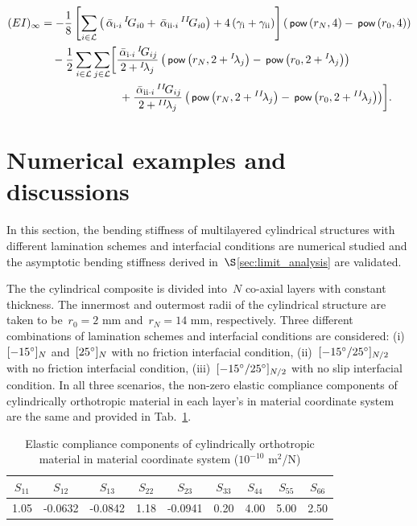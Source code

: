 \documentclass[preprint,12pt,times]{elsarticle}
\numberwithin{equation}{section}
\newcommand{\pr}[1]{\left( #1 \right)}
\newcommand{\p}{\,\textsf{\small pow}}
\newcommand{\alphaBARsub}[2]{
\IfEqCase{#2}{
        {i}{\,\bar{\alpha}_{ {#1}\cdot { \scriptstyle #2}}\,}%
    }[\,\bar{\alpha}_{ {#1}\cdot {\scriptscriptstyle #2}}\,]}
\newcommand{\RN}[1]{%
  \textup{\uppercase\expandafter{\romannumeral#1}}%
}
\renewcommand{\>}{$\Rightarrow$}
\begin{document}
\begin{equation}
\begin{aligned}
(EI)_{\infty}  & = - \frac{1}{8} \left[ \sum_{i \in \mathcal{L}} \left( \alphaBARsub{\RN{1}}{i} {}^{I}\!G_{i0} + \alphaBARsub{\RN{2}}{i} {}^{II}\!G_{i0} \right) + 4\left( \gamma_{\RN{1}} +\gamma_{\RN{2}} \right) \right] \left( \p\pr{r_{N},4} - \p\pr{r_{0},4} \right) \\
  & \quad - \frac{1}{2} \sum_{i \in \mathcal{L}} \sum_{j \in \mathcal{L}} \biggr[ \frac{\alphaBARsub{\RN{1}}{i} {}^{I}\!G_{ij}}{2 + {}^{I}\!\lambda_{j} } \left( \p\pr{r_{N},2 + {}^{I}\!\lambda_{j}} - \p\pr{r_{0},2 + {}^{I}\!\lambda_{j}} \right) \\
  & \qquad \qquad \qquad \quad + \frac{\alphaBARsub{\RN{2}}{i} {}^{II}\!G_{ij}}{2 + {}^{II}\!\lambda_{j}} \left( \p\pr{r_{N},2 + {}^{II}\!\lambda_{j}} - \p\pr{r_{0},2 + {}^{II}\!\lambda_{j}} \right) \biggr] .
\end{aligned}
\label{eq:two_mat_no_slip_EI}
\end{equation}
\section{Numerical examples and discussions}
\label{sec:discussion}
In this section, the bending stiffness of multilayered cylindrical structures with different lamination schemes and interfacial conditions are numerical studied and the asymptotic bending stiffness derived in~$\S$\ref{sec:limit_analysis} are validated.

The the cylindrical composite is divided into~$N$ co-axial layers with constant thickness.
The innermost and outermost radii of the cylindrical structure are taken to be~$r_{0} = 2$ mm and~$r_{N} = 14$ mm, respectively.
Three different combinations of lamination schemes and interfacial conditions are considered: (i)~$[-15 \degree]_N$ and~$[25 \degree]_N$ with no friction interfacial condition, (ii)~$[-15 \degree/ 25 \degree]_{N/2}$ with no friction interfacial condition, (iii)~$[-15 \degree/25 \degree]_{N/2}$ with no slip interfacial condition. In all three scenarios, the non-zero elastic compliance components of cylindrically orthotropic material in each layer's in material coordinate system are the same and provided in Tab.~\ref{tab:sij}.
\begin{table}[h]
  \begin{center}
    \caption{Elastic compliance components of cylindrically orthotropic material in material coordinate system ($10^{-10}$ m$^2$/N) }
    \label{tab:sij}
    \begin{tabular}{|c|c|c|c|c|c|c|c|c|}\hline
      $S_{11}$ & $S_{12}$ & $S_{13}$ & $S_{22}$ & $S_{23}$ &
      $S_{33}$ & $S_{44}$ & $S_{55}$ & $S_{66}$  \\ \hline
      1.05 & -0.0632 & -0.0842 & 1.18 & -0.0941 &
      0.20 & 4.00 & 5.00 & 2.50  \\ \hline
    \end{tabular}
  \end{center}
\end{table}
\end{document}
